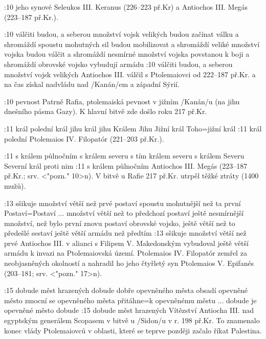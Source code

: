 :10 {jeho synové} Seleukos III. Keranus (226--223 př.Kr) a Antiochos III. Megás (223--187 př.Kr.).

:10  
    {válčiti budou, a seberou množství vojsk velikých}   %
    {budou začínat válku a shromáždí spoustu mohutných sil}   %
    {budou mobilizovat a shromáždí veliké množství vojska}   %
    {budou válčit a shromáždí nesmírné množství vojska}   %
    {povstanou k boji a shromáždí obrovské vojsko}   %
    {vybudují armádu}   %
:10 {válčiti budou, a seberou množství vojsk velikých}
    Antiochos III. válčil s Ptolemaiovci od 222--187 př.Kr. a na čas získal nadvládu nad \x/Kanán/em a západní Sýrií. 

:10 {pevnost} Patrně Rafia, ptolemaiská pevnost v jižním \x/Kanán/u (na jihu dnešního pásma        Gazy). K hlavní bitvě zde došlo roku 217 př.Kr.

:11  
    {král polední}  %
    {král jihu}      %
    {král jihu}   %
    {Králem Jihu}   %
    {Jižní král}   %
    {Toho}={jižní král}   %
:11 {král polední}  Ptolemaios IV. Filopatór (221--203 př.Kr.).
    
:11  
    {s králem půlnočním}   %
    {s králem severu}   %
    {s tím králem severu}   %
    {s králem Severu}   %
    {Severní král}   %
    {proti nim}   %
:11
    {s králem půlnočním}
     Antiochos III. Megás (223--187 př.Kr.; srv. <"pozn." 10>n). V bitvě u Rafie 217 př.Kr. utrpěl těžké ztráty (1400 mužů).
     
:13  
    {sšikuje množství větší než prvé}   %
    {postaví spoustu mohutnější než ta první}   %
    {Postaví}={Postaví ... množství větší než to předchozí}   %
    {postaví ještě nesmírnější množství, než bylo první}   %
    {znovu postaví obrovské vojsko, ještě větší než to předešlé}   %
    {sestaví ještě větší armádu než předtím}   %
:13 {sšikuje množství větší než prvé}
    Antiochos III. v alianci s Filipem V. Makedonským vybudoval ještě větší armádu k invazi na Ptolemaiovská území. Ptolemaios IV. Filopatór zemřel za neobjasněných okolností a nahradil ho jeho čtyřletý syn Ptolemaios V. Epifanés (203--181; srv. <"pozn." 17>n).

:15  
    {dobude měst hrazených}   %
    {dobude dobře opevněného města}   %
    {obsadí opevněné město}   %
    {zmocní se opevněného města}   %
    {přitáhne}={k opevněnému městu ... dobude je}   %
    {opevněné město dobude}   %
:15 {dobude měst hrazených}
    Vítězství Antiocha III. nad egyptským generálem Scopasem v bitvě u \x/Sidon/u v r. 198 př.Kr. To znamenalo konec vlády Ptolemaiovců v oblasti, které se teprve později začalo říkat Palestina.

